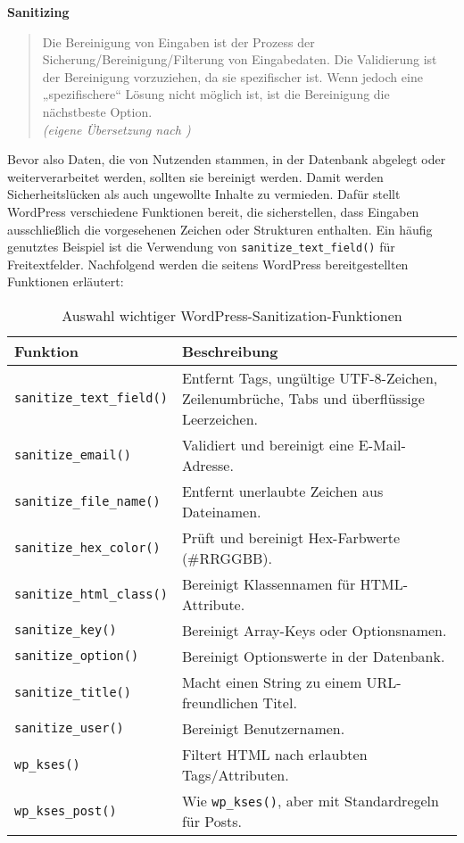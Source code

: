 \textbf{Sanitizing}
\begin{quote}
 Die Bereinigung von Eingaben ist der Prozess der Sicherung/Bereinigung/Filterung von Eingabedaten.
 Die Validierung ist der Bereinigung vorzuziehen, da sie spezifischer ist.
 Wenn jedoch eine „spezifischere“ Lösung nicht möglich ist, ist die Bereinigung die nächstbeste Option.
 \\[0.5em]
 \emph{(eigene Übersetzung nach \cite{wordpress2024plugin_sanitizing})}
\end{quote}


Bevor also Daten, die von Nutzenden stammen, in der Datenbank abgelegt oder weiterverarbeitet werden,
sollten sie bereinigt werden.
Damit werden Sicherheitslücken als auch ungewollte Inhalte zu vermieden.
Dafür stellt WordPress verschiedene Funktionen bereit, die sicherstellen, dass Eingaben ausschließlich
die vorgesehenen Zeichen oder Strukturen enthalten.
Ein häufig genutztes Beispiel ist die Verwendung von \texttt{sanitize\_text\_field()} für Freitextfelder.
Nachfolgend werden die seitens WordPress bereitgestellten Funktionen erläutert:

\begin{table}[h]
 \centering
 \begin{tabular}{|l|p{8cm}|}
  \hline
  \textbf{Funktion} & \textbf{Beschreibung} \\
  \hline
  \texttt{sanitize\_text\_field()} & Entfernt Tags, ungültige UTF-8-Zeichen, \newline Zeilenumbrüche, Tabs und überflüssige Leerzeichen. \\
  \hline
  \texttt{sanitize\_email()} & Validiert und bereinigt eine E-Mail-Adresse. \\
  \hline
  \texttt{sanitize\_file\_name()} & Entfernt unerlaubte Zeichen aus Dateinamen. \\
  \hline
  \texttt{sanitize\_hex\_color()} & Prüft und bereinigt Hex-Farbwerte (\#RRGGBB). \\
  \hline
  \texttt{sanitize\_html\_class()} & Bereinigt Klassennamen für HTML-Attribute. \\
  \hline
  \texttt{sanitize\_key()} & Bereinigt Array-Keys oder Optionsnamen. \\
  \hline
  \texttt{sanitize\_option()} & Bereinigt Optionswerte in der Datenbank. \\
  \hline
  \texttt{sanitize\_title()} & Macht einen String zu einem URL-freundlichen Titel. \\
  \hline
  \texttt{sanitize\_user()} & Bereinigt Benutzernamen. \\
  \hline
  \texttt{wp\_kses()} & Filtert HTML nach erlaubten Tags/Attributen. \\
  \hline
  \texttt{wp\_kses\_post()} & Wie \texttt{wp\_kses()}, aber mit Standardregeln für Posts. \\
  \hline
 \end{tabular}
 \caption{Auswahl wichtiger WordPress-Sanitization-Funktionen}
\end{table}

